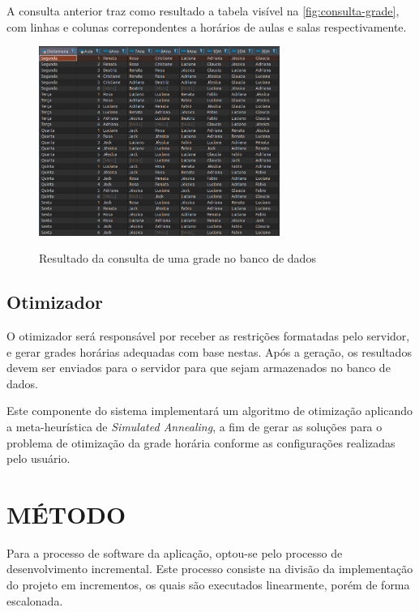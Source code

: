 A consulta anterior traz como resultado a tabela visível na \autoref{fig:consulta-grade}, com linhas e colunas correpondentes a horários de aulas e salas respectivamente.

\begin{figure}[!htb]
	\centering
	\caption{Resultado da consulta de uma grade no banco de dados}
	\includegraphics[width=0.7\textwidth]{./dados/figuras/ConsultaGrade}
	\label{fig:consulta-grade}
\end{figure}

\newpage
\subsection{Otimizador}
O otimizador será responsável por receber as restrições formatadas pelo servidor, e gerar grades horárias adequadas com base nestas. Após a geração, os resultados devem ser enviados para o servidor para que sejam armazenados no banco de dados.

Este componente do sistema implementará um algoritmo de otimização aplicando a meta-heurística de \textit{Simulated Annealing}, a fim de gerar as soluções para o problema de otimização da grade horária conforme as configurações realizadas pelo usuário.

\section{MÉTODO}
\label{sec:metodo}
Para a processo de software da aplicação, optou-se pelo processo de desenvolvimento incremental. Este processo consiste na divisão da implementação do projeto em incrementos, os quais são executados linearmente, porém de forma escalonada.\cite{pressman2016}

